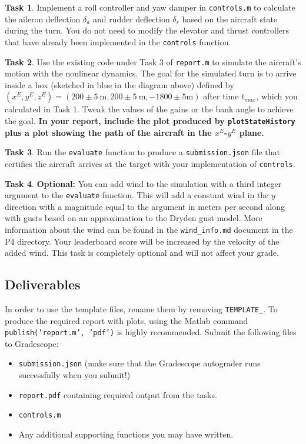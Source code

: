 \documentclass{article}
\theoremstyle{definition}
\newtheorem{task}{Task}
\begin{document}
\begin{task}
    Implement a roll controller and yaw damper in \texttt{controls.m} to calculate the aileron deflection $\delta_a$ and rudder deflection $\delta_r$ based on the aircraft state during the turn. 
You do not need to modify the elevator and thrust controllers that have already been implemented in the \texttt{controls} function.
\end{task}

\begin{task}
    Use the existing code under Task 3 of \texttt{report.m} to simulate the aircraft's motion with the nonlinear dynamics. The goal for the simulated turn is to arrive inside a box (sketched in blue in the diagram above) defined by $(x^E,y^E,z^E) = (200 \pm 5\ \text{m},200 \pm 5\ \text{m}, -1800 \pm 5 \text{m})$ after time $t_{max}$, which you calculated in Task 1. Tweak the values of the gains or the bank angle to achieve the goal.
    \textbf{In your report, include the plot produced by \texttt{plotStateHistory} plus a plot showing the path of the aircraft in the $x^E$-$y^E$ plane.}
\end{task}

\begin{task}
    Run the \texttt{evaluate} function to produce a \texttt{submission.json} file that certifies the aircraft arrives at the target with your implementation of \texttt{controls}.
\end{task}

\begin{task}
    \textbf{Optional:}
    You can add wind to the simulation with a third integer argument to the \texttt{evaluate} function. This will add a constant wind in the $y$ direction with a magnitude equal to the argument in meters per second along with gusts based on an approximation to the Dryden gust model. More information about the wind can be found in the \texttt{wind\_info.md} document in the P4 directory. Your leaderboard score will be increased by the velocity of the added wind. This task is completely optional and will not affect your grade.
\end{task}

\subsection*{Deliverables}
In order to use the template files, rename them by removing \texttt{TEMPLATE\_}. To produce the required report with plots, using the Matlab command \texttt{publish('report.m', 'pdf')} is highly recommended. Submit the following files to Gradescope:

\begin{itemize}[noitemsep]
    \item \texttt{submission.json} (make sure that the Gradescope autograder runs successfully when you submit!)
    \item \texttt{report.pdf} containing required output from the tasks.
    \item \texttt{controls.m}
    \item Any additional supporting functions you may have written.
\end{itemize}
\end{document}
